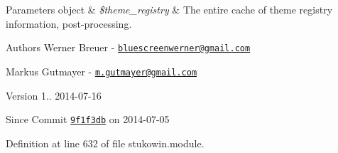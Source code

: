 \begin{DoxyParams}[1]{Parameters}
object & {\em \$theme\+\_\+registry} & The entire cache of theme registry information, post-\/processing.\\
\hline
\end{DoxyParams}
\begin{DoxyAuthor}{Authors}
Werner Breuer -\/ \href{mailto:bluescreenwerner@gmail.com}{\tt bluescreenwerner@gmail.\+com} 

Markus Gutmayer -\/ \href{mailto:m.gutmayer@gmail.com}{\tt m.\+gutmayer@gmail.\+com} 
\end{DoxyAuthor}
\begin{DoxyVersion}{Version}
1.. 2014-\/07-\/16 
\end{DoxyVersion}
\begin{DoxySince}{Since}
Commit \href{http://github.com/TheJake123/DrupalModul/commit/9f1f3db3b94f0c44518af0f58401bac46f41d7cb}{\tt 9f1f3db} on 2014-\/07-\/05 
\end{DoxySince}


Definition at line 632 of file stukowin.\+module.

